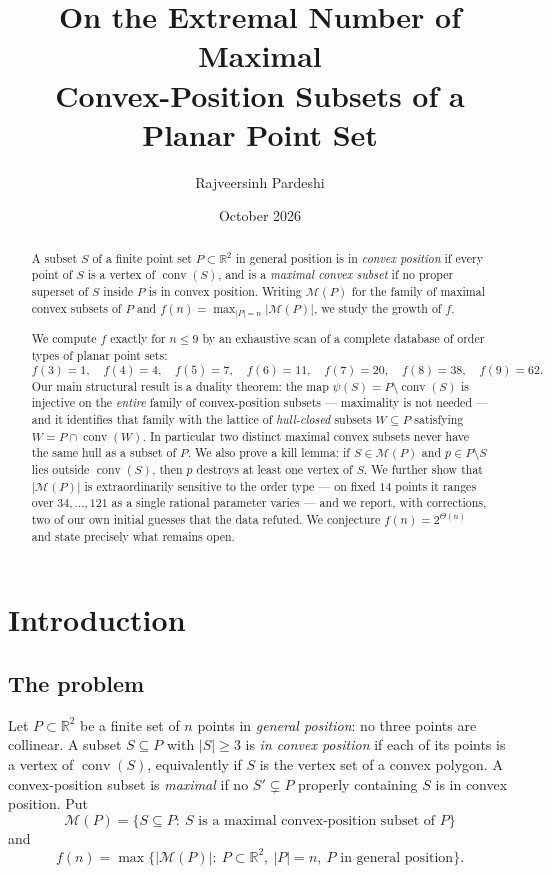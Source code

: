\documentclass[11pt,a4paper]{article}
\title{\bf On the Extremal Number of Maximal\\
       Convex-Position Subsets of a Planar Point Set}
\author{Rajveersinh Pardeshi}
\date{October 2026}
\theoremstyle{definition}
\newcommand{\conv}{\operatorname{conv}}
\newcommand{\M}{\mathcal{M}}
\begin{document}
\maketitle

\begin{abstract}
A subset $S$ of a finite point set $P\subset\mathbb{R}^2$ in general position is in
\emph{convex position} if every point of $S$ is a vertex of $\conv(S)$, and is a
\emph{maximal convex subset} if no proper superset of $S$ inside $P$ is in convex
position.  Writing $\M(P)$ for the family of maximal convex subsets of $P$ and
$f(n)=\max_{|P|=n}|\M(P)|$, we study the growth of $f$.

We compute $f$ exactly for $n\le 9$ by an exhaustive scan of a complete database
of order types of planar point sets:
\[
  f(3)=1,\quad f(4)=4,\quad f(5)=7,\quad f(6)=11,\quad
  f(7)=20,\quad f(8)=38,\quad f(9)=62 .
\]
Our main structural result is a duality theorem: the map
$\psi(S)=P\setminus\conv(S)$ is injective on the \emph{entire} family of
convex-position subsets --- maximality is not needed --- and it identifies that
family with the lattice of \emph{hull-closed} subsets $W\subseteq P$ satisfying
$W=P\cap\conv(W)$.  In particular two distinct maximal convex subsets never have
the same hull as a subset of $P$.  We also prove a kill lemma: if $S\in\M(P)$ and
$p\in P\setminus S$ lies outside $\conv(S)$, then $p$ destroys at least one
vertex of $S$.  We further show that $|\M(P)|$ is extraordinarily sensitive to
the order type --- on fixed $14$ points it ranges over $34,\dots,121$ as a single
rational parameter varies --- and we report, with corrections, two of our own
initial guesses that the data refuted.  We conjecture $f(n)=2^{\Theta(n)}$ and
state precisely what remains open.
\end{abstract}

\section{Introduction}
\label{sec:intro}

\subsection{The problem}

Let $P\subset\mathbb{R}^2$ be a finite set of $n$ points in \emph{general
position}: no three points are collinear.  A subset $S\subseteq P$ with $|S|\ge 3$
is \emph{in convex position} if each of its points is a vertex of $\conv(S)$,
equivalently if $S$ is the vertex set of a convex polygon.  A convex-position
subset is \emph{maximal} if no $S'\subsetneq P$ properly containing $S$ is in
convex position.  Put
\[
  \M(P)=\bigl\{S\subseteq P:\ S \text{ is a maximal convex-position subset of } P\bigr\}
\]
and
\[
  f(n)=\max\bigl\{|\M(P)|:\ P\subset\mathbb{R}^2,\ |P|=n,\ \text{\(P\) in general position}\bigr\}.
\]
\end{document}
